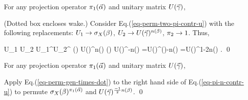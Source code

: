 For any projection operator
$\pi_1(\vec{\alpha})$ and
unitary matrix $U(\vec{\gamma})$,


(Dotted box encloses wake.)
\proof
Consider Eq.(\ref{eq-perm-two-pi-contr-u})
with the following replacements:
$U_1\rightarrow {\sigma_X}(\beta)$,
$U_2\rightarrow U({\vec{\gamma}})^{n(\beta)}$,
$\pi_2\rightarrow 1$.
Thus,

\beq
U_1 U_2 U_1^\dagger U_2^\dagger
\rarrow
\sigx(\bitb)
U(\vecbitc)^{n(\bitb)}
\sigx(\bitb)
U(\vecbitc)^{-n(\bitb)}
=U(\vecbitc)^{\nbar(\bitb)-n(\bitb)}
=U(\vecbitc)^{1-2n(\bitb)}
\;.
\eeq
\qed

\claim

For any projection operator
$\pi_1(\vec{\alpha})$ and
unitary matrix $U(\vec{\gamma})$,

\proof
Apply Eq.(\ref{eq-perm-gen-times-dot})
to the right hand side of
Eq.(\ref{eq-pi-n-contr-u}) to permute
${\sigma_X}(\beta)^{\pi_1({\vec{\alpha}})}$
and
$U({\vec{\gamma}})^{\frac{-1}{2}n(\beta)}$.
\qed

